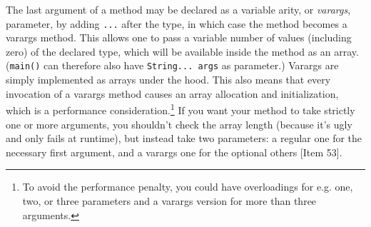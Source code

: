 \documentclass[table, xcdraw]{article}%
\begin{document}
The last argument of a method may be declared as a variable arity, or \emph{varargs}, parameter, by adding \texttt{...} after the type, in which case the method becomes a varargs method. This allows one to pass a variable number of values (including zero) of the declared type, which will be available inside the method as an array. (\texttt{main()} can therefore also have \texttt{String... args} as parameter.) Varargs are simply implemented as arrays under the hood. This also means that every invocation of a varargs method causes an array allocation and initialization, which is a performance consideration.\footnote{To avoid the performance penalty, you could have overloadings for e.g. one, two, or three parameters and a varargs version for more than three arguments.} If you want your method to take strictly one or more arguments, you shouldn't check the array length (because it's ugly and only fails at runtime), but instead take two parameters: a regular one for the necessary first argument, and a varargs one for the optional others [Item 53].
\end{document}
